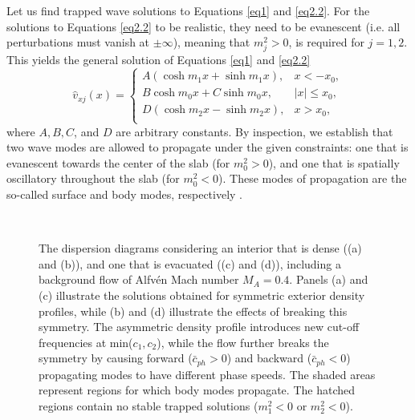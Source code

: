Let us find trapped wave solutions to Equations \eqref{eq1} and \eqref{eq2.2}. For the solutions to Equations \eqref{eq2.2} to be realistic, they need to be evanescent (i.e. all perturbations must vanish at $\pm \infty$), meaning that $m_j^2 > 0$, is required for $j = 1, 2$. This yields the general solution of Equations \eqref{eq1} and \eqref{eq2.2}
\begin{equation}
\label{eq2.3}
 \hat{v}_{xj} (x) =
  \begin{cases}
    A(\cosh m_1 x + \sinh m_1 x),    & x < - x_0,\\
    B \cosh m_0 x + C \sinh m_0 x,  & |x| \leq x_0,\\
    D(\cosh m_2 x - \sinh m_2 x),    & x > x_0,\\
  \end{cases}
\end{equation}
where $A, B, C$, and $D$ are arbitrary constants. By inspection, we establish that two wave modes are allowed to propagate under the given constraints: one that is evanescent towards the center of the slab (for $m_0^2 > 0$), and one that is spatially oscillatory throughout the slab (for $m_0^2 < 0$). These modes of propagation are the so-called surface and body modes, respectively \citep[see, for example,][]{Roberts1981b}.

\begin{figure}[t]
\centering
{}
\hspace{3pt}
\\
\hspace{3pt}
\caption{The dispersion diagrams considering an interior that is dense ((a) and (b)), and one that is evacuated ((c) and (d)), including a background flow of Alfv\'en Mach number $M_A = 0.4$. Panels (a) and (c) illustrate the solutions obtained for symmetric exterior density profiles, while (b) and (d) illustrate the effects of breaking this symmetry. The asymmetric density profile introduces new cut-off frequencies at min($c_1, c_2$), while the flow further breaks the symmetry by causing forward ($\bar c_{ph} > 0$) and backward ($\bar c_{ph} < 0$) propagating modes to have different phase speeds. The shaded areas represent regions for which body modes propagate. The hatched regions contain no stable trapped solutions ($m_1^2 < 0$ or $m_2^2 < 0$).}
\label{fig1}
\end{figure}

